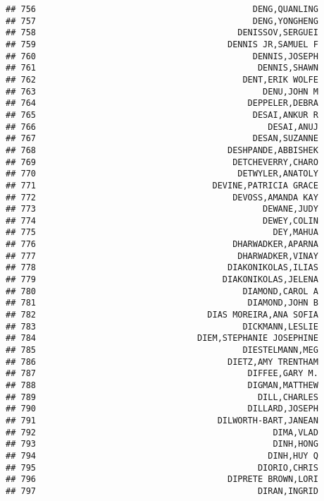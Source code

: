 \documentclass[
]{article}
\begin{document}
\begin{verbatim}
## 756                                           DENG,QUANLING
## 757                                           DENG,YONGHENG
## 758                                        DENISSOV,SERGUEI
## 759                                      DENNIS JR,SAMUEL F
## 760                                           DENNIS,JOSEPH
## 761                                            DENNIS,SHAWN
## 762                                         DENT,ERIK WOLFE
## 763                                             DENU,JOHN M
## 764                                          DEPPELER,DEBRA
## 765                                           DESAI,ANKUR R
## 766                                              DESAI,ANUJ
## 767                                           DESAN,SUZANNE
## 768                                      DESHPANDE,ABBISHEK
## 769                                       DETCHEVERRY,CHARO
## 770                                        DETWYLER,ANATOLY
## 771                                   DEVINE,PATRICIA GRACE
## 772                                       DEVOSS,AMANDA KAY
## 773                                             DEWANE,JUDY
## 774                                             DEWEY,COLIN
## 775                                               DEY,MAHUA
## 776                                       DHARWADKER,APARNA
## 777                                        DHARWADKER,VINAY
## 778                                      DIAKONIKOLAS,ILIAS
## 779                                     DIAKONIKOLAS,JELENA
## 780                                         DIAMOND,CAROL A
## 781                                          DIAMOND,JOHN B
## 782                                  DIAS MOREIRA,ANA SOFIA
## 783                                         DICKMANN,LESLIE
## 784                                DIEM,STEPHANIE JOSEPHINE
## 785                                         DIESTELMANN,MEG
## 786                                      DIETZ,AMY TRENTHAM
## 787                                          DIFFEE,GARY M.
## 788                                          DIGMAN,MATTHEW
## 789                                            DILL,CHARLES
## 790                                          DILLARD,JOSEPH
## 791                                    DILWORTH-BART,JANEAN
## 792                                               DIMA,VLAD
## 793                                               DINH,HONG
## 794                                              DINH,HUY Q
## 795                                            DIORIO,CHRIS
## 796                                      DIPRETE BROWN,LORI
## 797                                            DIRAN,INGRID

\end{verbatim}
\end{document}
